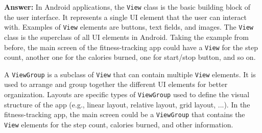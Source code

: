 \documentclass{usireport}
\begin{document}
\textbf{Answer:} In Android applications, the \texttt{View} class is the basic building block of the user interface. It represents a single UI element that the user can interact with. Examples of \texttt{View} elements are buttons, text fields, and images. The \texttt{View} class is the superclass of all UI elements in Android.
Taking the example from before, the main screen of the fitness-tracking app could have a \texttt{View} for the step count, another one for the calories burned, one for start/stop button, and so on.

A \texttt{ViewGroup} is a subclass of \texttt{View} that can contain multiple \texttt{View} elements. It is used to arrange and group together the different UI elements for better organization. Layouts are specific types of \texttt{ViewGroup} used to define the visual structure of the app (e.g., linear layout, relative layout, grid layout, ...). In the fitness-tracking app, the main screen could be a \texttt{ViewGroup} that contains the \texttt{View} elements for the step count, calories burned, and other information.
\end{document}
